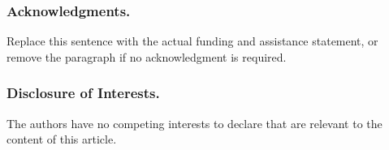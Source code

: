 \documentclass[runningheads]{llncs}
\begin{document}
\subsubsection{Acknowledgments.}
Replace this sentence with the actual funding and assistance statement, or
remove the paragraph if no acknowledgment is required.

\subsubsection{Disclosure of Interests.}
The authors have no competing interests to declare that are relevant to the
content of this article.



\end{document}
